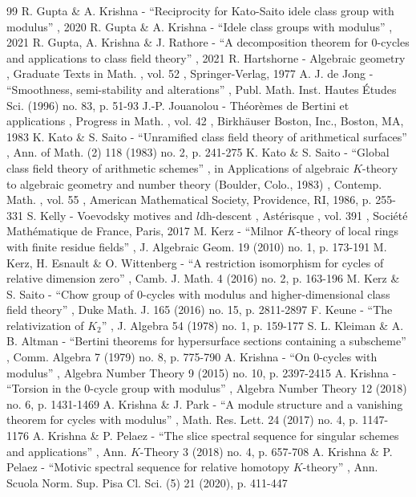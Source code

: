\documentclass[11pt]{article}
\numberwithin{equation}{section}
\theoremstyle{definition}
\begin{document}
\begin{thebibliography}{99}
 R. Gupta \& A. Krishna - “Reciprocity for Kato-Saito idele class group with modulus” , 2020
 R. Gupta \& A. Krishna - “Idele class groups with modulus” , 2021
 R. Gupta, A. Krishna \& J. Rathore - “A decomposition theorem for $0$-cycles and applications to class field theory” , 2021
 R. Hartshorne - Algebraic geometry , Graduate Texts in Math. , vol. 52 , Springer-Verlag, 1977
 A. J. de Jong - “Smoothness, semi-stability and alterations” , Publ. Math. Inst. Hautes Études Sci. (1996) no. 83, p. 51-93
 J.-P. Jouanolou - Théorèmes de Bertini et applications , Progress in Math. , vol. 42 , Birkhäuser Boston, Inc., Boston, MA, 1983
 K. Kato \& S. Saito - “Unramified class field theory of arithmetical surfaces” , Ann. of Math. (2) 118 (1983) no. 2, p. 241-275
 K. Kato \& S. Saito - “Global class field theory of arithmetic schemes” , in Applications of algebraic $K$-theory to algebraic geometry and number theory (Boulder, Colo., 1983) , Contemp. Math. , vol. 55 , American Mathematical Society, Providence, RI, 1986, p. 255-331
 S. Kelly - Voevodsky motives and $l$dh-descent , Astérisque , vol. 391 , Société Mathématique de France, Paris, 2017
 M. Kerz - “Milnor $K$-theory of local rings with finite residue fields” , J. Algebraic Geom. 19 (2010) no. 1, p. 173-191
 M. Kerz, H. Esnault \& O. Wittenberg - “A restriction isomorphism for cycles of relative dimension zero” , Camb. J. Math. 4 (2016) no. 2, p. 163-196
 M. Kerz \& S. Saito - “Chow group of 0-cycles with modulus and higher-dimensional class field theory” , Duke Math. J. 165 (2016) no. 15, p. 2811-2897
 F. Keune - “The relativization of $K_{2}$” , J. Algebra 54 (1978) no. 1, p. 159-177
 S. L. Kleiman \& A. B. Altman - “Bertini theorems for hypersurface sections containing a subscheme” , Comm. Algebra 7 (1979) no. 8, p. 775-790
 A. Krishna - “On 0-cycles with modulus” , Algebra Number Theory 9 (2015) no. 10, p. 2397-2415
 A. Krishna - “Torsion in the 0-cycle group with modulus” , Algebra Number Theory 12 (2018) no. 6, p. 1431-1469
 A. Krishna \& J. Park - “A module structure and a vanishing theorem for cycles with modulus” , Math. Res. Lett. 24 (2017) no. 4, p. 1147-1176
 A. Krishna \& P. Pelaez - “The slice spectral sequence for singular schemes and applications” , Ann. $K$-Theory 3 (2018) no. 4, p. 657-708
 A. Krishna \& P. Pelaez - “Motivic spectral sequence for relative homotopy $K$-theory” , Ann. Scuola Norm. Sup. Pisa Cl. Sci. (5) 21 (2020), p. 411-447

\end{thebibliography}
\end{document}
